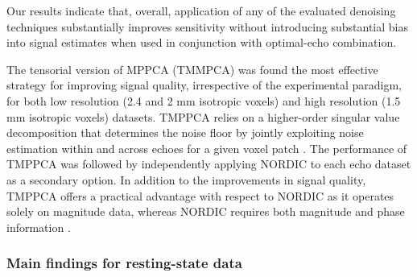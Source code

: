  Our results indicate that, overall, application of any of the evaluated denoising techniques substantially improves sensitivity without introducing substantial bias into signal estimates when used in conjunction with optimal-echo combination. 

The tensorial version of MPPCA (TMMPCA) \citep{olesenTensorDenoisingMultidimensional2023} was found the most effective strategy for improving signal quality, irrespective of the experimental paradigm, for both low resolution (2.4 and 2 mm isotropic voxels) and high resolution (1.5 mm isotropic voxels) datasets. TMPPCA relies on a higher-order singular value decomposition that determines the noise floor by jointly exploiting noise estimation within and across echoes for a given voxel patch \citep{olesenTensorDenoisingMultidimensional2023}. The performance of TMPPCA was followed by independently applying NORDIC \citep{vizioli2021lowering} to each echo dataset as a secondary option. In addition to the improvements in signal quality, TMPPCA offers a practical advantage with respect to NORDIC as it operates solely on magnitude data, whereas NORDIC requires both magnitude and phase information \citep{dowdle2023evaluating,vizioli2021lowering}.\\

\subsubsection{Main findings for resting-state data}

